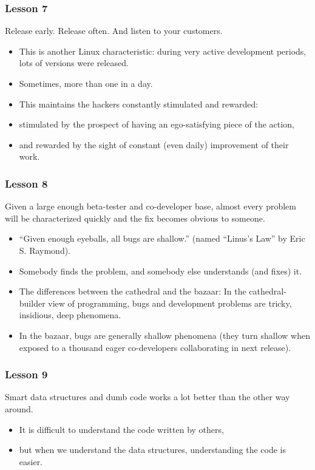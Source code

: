 \documentclass{beamer}
\begin{document}
\begin{frame}
\frametitle{Lesson 7}

\begin{center}
{\large Release early. Release often. And listen to your customers.}
\end{center}

\begin{itemize}
\item This is another Linux characteristic: during very active
  development periods, lots of versions were released.
\item Sometimes, more than one in a day.
\item This maintains the hackers constantly stimulated and rewarded:
\item stimulated by the prospect of having an ego-satisfying piece of the action,
\item and rewarded by the sight of constant (even daily) improvement
  of their work.
\end{itemize}

\end{frame}

\begin{frame}
\frametitle{Lesson 8}

\begin{center}
{\large Given a large enough beta-tester and co-developer base, almost
  every problem will be characterized quickly and the fix becomes obvious to
  someone.}
\end{center}

\begin{itemize}
\item ``Given enough eyeballs, all bugs are shallow.'' (named ``Linus's
  Law'' by Eric S. Raymond).
\item Somebody finds the problem, and somebody else understands (and
  fixes) it.
\item The differences between the cathedral and the bazaar: In the
  cathedral-builder view of programming, bugs and development problems
  are tricky, insidious, deep phenomena.
\item In the bazaar, bugs are generally shallow phenomena (they turn
  shallow when exposed to a thousand eager co-developers collaborating
  in next release).
\end{itemize}

\end{frame}

\begin{frame}
\frametitle{Lesson 9}

\begin{center}
{\large Smart data structures and dumb code works a lot better than
  the other way around.}
\end{center}

\begin{itemize}
\item It is difficult to understand the code written by others,
\item but when we understand the data structures, understanding the
  code is easier.
\end{itemize}

\end{frame}
\end{document}
